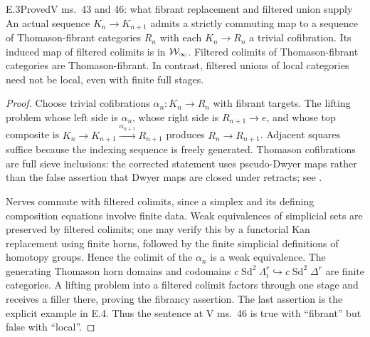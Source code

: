 \begin{claim}{E.3}{Proved}{V ms.~43 and 46: what fibrant replacement and filtered union supply}
An actual sequence $K_n\to K_{n+1}$ admits a strictly commuting map to a sequence of Thomason-fibrant categories $R_n$ with each $K_n\to R_n$ a trivial cofibration. Its induced map of filtered colimits is in $\mathcal W_\infty$. Filtered colimits of Thomason-fibrant categories are Thomason-fibrant. In contrast, filtered unions of local categories need not be local, even with finite full stages.
\end{claim}
\begin{proof}
Choose trivial cofibrations $\alpha_n:K_n\to R_n$ with fibrant targets. The lifting problem whose left side is $\alpha_n$, whose right side is $R_{n+1}\to e$, and whose top composite is $K_n\to K_{n+1}\xrightarrow{\alpha_{n+1}}R_{n+1}$ produces $R_n\to R_{n+1}$. Adjacent squares suffice because the indexing sequence is freely generated. Thomason cofibrations are full sieve inclusions: the corrected statement uses pseudo-Dwyer maps rather than the false assertion that Dwyer maps are closed under retracts; see \citet[Proposition~2.4 and the following discussion]{Raptis2010}.

Nerves commute with filtered colimits, since a simplex and its defining composition equations involve finite data. Weak equivalences of simplicial sets are preserved by filtered colimits; one may verify this by a functorial Kan replacement using finite horns, followed by the finite simplicial definitions of homotopy groups. Hence the colimit of the $\alpha_n$ is a weak equivalence. The generating Thomason horn domains and codomains $c\operatorname{Sd}^2\Lambda_i^r\hookrightarrow c\operatorname{Sd}^2\Delta^r$ are finite categories. A lifting problem into a filtered colimit factors through one stage and receives a filler there, proving the fibrancy assertion. The last assertion is the explicit example in E.4. Thus the sentence at V ms.~46 is true with ``fibrant'' but false with ``local''.
\end{proof}

